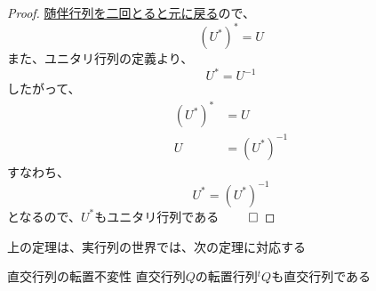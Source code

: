 \documentclass[../../../topic_linear-algebra]{subfiles}
\begin{document}
\begin{proof}
  \hyperref[thm:adjoint-involution]{随伴行列を二回とると元に戻る}ので、
  \begin{equation*}
    (U^*)^* = U
  \end{equation*}
  また、ユニタリ行列の定義より、
  \begin{equation*}
    U^* = U^{-1}
  \end{equation*}
  したがって、
  \begin{align*}
    (U^*)^* & = U          \\
    U       & = (U^*)^{-1}
  \end{align*}
  すなわち、
  \begin{equation*}
    U^* = (U^*)^{-1}
  \end{equation*}
  となるので、$U^*$もユニタリ行列である $\qed$
\end{proof}

\br

上の定理は、実行列の世界では、次の定理に対応する

\begin{theorem}{直交行列の転置不変性}\label{thm:transpose-of-orthogonal}
  直交行列$Q$の転置行列${}^tQ$も直交行列である
\end{theorem}
\end{document}

